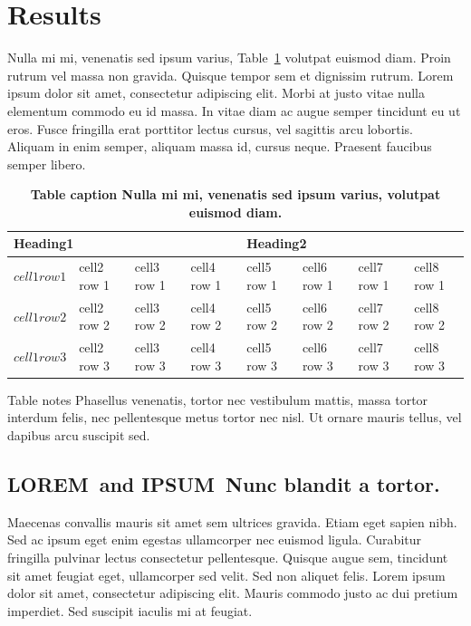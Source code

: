 \documentclass[10pt,letterpaper]{article}
\newcommand{\lorem}{{\bf LOREM}}
\newcommand{\ipsum}{{\bf IPSUM}}
\begin{document}
\newpage
\section*{Results}
Nulla mi mi, venenatis sed ipsum varius, Table~\ref{table1} volutpat euismod diam. Proin rutrum vel massa non gravida. Quisque tempor sem et dignissim rutrum. Lorem ipsum dolor sit amet, consectetur adipiscing elit. Morbi at justo vitae nulla elementum commodo eu id massa. In vitae diam ac augue semper tincidunt eu ut eros. Fusce fringilla erat porttitor lectus cursus, vel sagittis arcu lobortis. Aliquam in enim semper, aliquam massa id, cursus neque. Praesent faucibus semper libero.


\begin{table}[!ht]
\begin{adjustwidth}{-2.25in}{0in} %
\caption{
{\bf Table caption Nulla mi mi, venenatis sed ipsum varius, volutpat euismod diam.}}
\begin{tabular}{|l|l|l|l|l|l|l|l|}
\hline
\multicolumn{4}{|l|}{\bf Heading1} & \multicolumn{4}{|l|}{\bf Heading2}\\ \hline
$cell1 row1$ & cell2 row 1 & cell3 row 1 & cell4 row 1 & cell5 row 1 & cell6 row 1 & cell7 row 1 & cell8 row 1\\ \hline
$cell1 row2$ & cell2 row 2 & cell3 row 2 & cell4 row 2 & cell5 row 2 & cell6 row 2 & cell7 row 2 & cell8 row 2\\ \hline
$cell1 row3$ & cell2 row 3 & cell3 row 3 & cell4 row 3 & cell5 row 3 & cell6 row 3 & cell7 row 3 & cell8 row 3\\ \hline
\end{tabular}
\begin{flushleft} Table notes Phasellus venenatis, tortor nec vestibulum mattis, massa tortor interdum felis, nec pellentesque metus tortor nec nisl. Ut ornare mauris tellus, vel dapibus arcu suscipit sed.
\end{flushleft}
\label{table1}
\end{adjustwidth}
\end{table}



\subsection*{\lorem\ and \ipsum\ Nunc blandit a tortor.}

Maecenas convallis mauris sit amet sem ultrices gravida. Etiam eget sapien nibh. Sed ac ipsum eget enim egestas ullamcorper nec euismod ligula. Curabitur fringilla pulvinar lectus consectetur pellentesque. Quisque augue sem, tincidunt sit amet feugiat eget, ullamcorper sed velit. Sed non aliquet felis. Lorem ipsum dolor sit amet, consectetur adipiscing elit. Mauris commodo justo ac dui pretium imperdiet. Sed suscipit iaculis mi at feugiat. 
\end{document}
